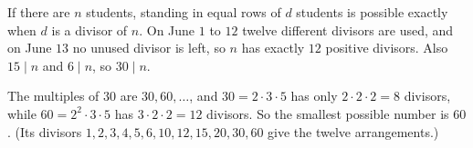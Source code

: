 If there are $n$ students, standing in equal rows of $d$ students is possible exactly when $d$ is a divisor of $n$. On June $1$ to $12$ twelve different divisors are used, and on June $13$ no unused divisor is left, so $n$ has exactly $12$ positive divisors. Also $15\mid n$ and $6\mid n$, so $30\mid n$.

The multiples of $30$ are $30,60,\dots$, and $30=2\cdot3\cdot5$ has only $2\cdot2\cdot2=8$ divisors, while $60=2^2\cdot3\cdot5$ has $3\cdot2\cdot2=12$ divisors. So the smallest possible number is $\boxed{60}$. (Its divisors $1,2,3,4,5,6,10,12,15,20,30,60$ give the twelve arrangements.)
